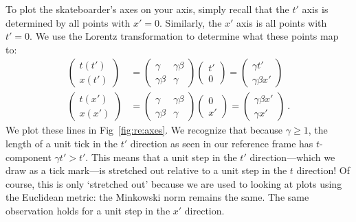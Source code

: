 \documentclass[12pt]{article}
\begin{document}
To plot the skateboarder's axes on your axis, simply recall that the $t'$ axis is determined by all points with $x'=0$. Similarly, the $x'$ axis is all points with $t'=0$. We use the Lorentz transformation to determine what these points map to:
\begin{align}
    \begin{pmatrix}
        t(t') \\ x(t')
    \end{pmatrix}
    &=
    \begin{pmatrix}
        \gamma & \gamma\beta
        \\
        \gamma\beta & \gamma
    \end{pmatrix}
    \begin{pmatrix}
        t' \\
        0
    \end{pmatrix}
    =
    \begin{pmatrix}
        \gamma t'\\ \gamma \beta x'
    \end{pmatrix} 
    \\
    \begin{pmatrix}
        t(x') \\ x(x')
    \end{pmatrix}
    &=
    \begin{pmatrix}
        \gamma & \gamma\beta
        \\
        \gamma\beta & \gamma
    \end{pmatrix}
    \begin{pmatrix}
        0 \\
        x'
    \end{pmatrix}
    =
    \begin{pmatrix}
        \gamma\beta x'\\ \gamma x'
    \end{pmatrix}
    \ .
    \label{eq:axis:transform}
\end{align}
We plot these lines in Fig~\ref{fig:re:axes}. 
We recognize that because $\gamma \geq 1$, the length of a unit tick in the $t'$ direction as seen in our reference frame has $t$-component $\gamma t' > t'$. This means that a unit step in the $t'$ direction---which we draw as a tick mark---is stretched out relative to a unit step in the $t$ direction! Of course, this is only `stretched out' because we are used to looking at plots using the Euclidean metric: the Minkowski norm remains the same. The same observation holds for a unit step in the $x'$ direction. 
\end{document}
